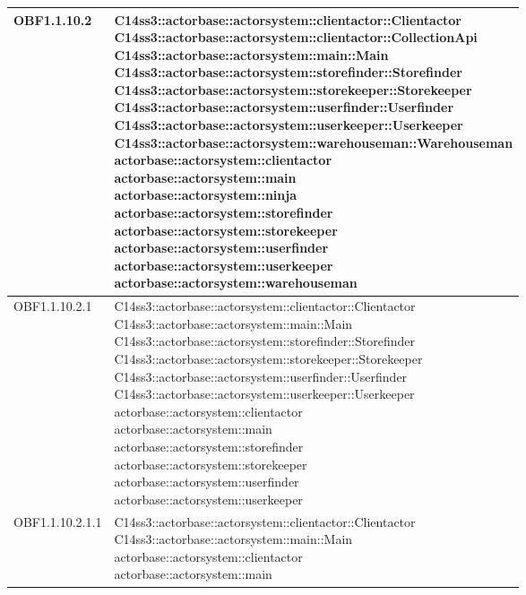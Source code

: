 \documentclass{scalatekids-article}
\begin{document}
\begin{longtable}[H]{|p{4.5cm}|p{13cm}|}
OBF1.1.10.2 & \multiLineCell[t]{C14ss3::actorbase::actorsystem::clientactor::Clientactor\\C14ss3::actorbase::actorsystem::clientactor::CollectionApi\\C14ss3::actorbase::actorsystem::main::Main\\C14ss3::actorbase::actorsystem::storefinder::Storefinder\\C14ss3::actorbase::actorsystem::storekeeper::Storekeeper\\C14ss3::actorbase::actorsystem::userfinder::Userfinder\\C14ss3::actorbase::actorsystem::userkeeper::Userkeeper\\C14ss3::actorbase::actorsystem::warehouseman::Warehouseman\\actorbase::actorsystem::clientactor\\actorbase::actorsystem::main\\actorbase::actorsystem::ninja\\actorbase::actorsystem::storefinder\\actorbase::actorsystem::storekeeper\\actorbase::actorsystem::userfinder\\actorbase::actorsystem::userkeeper\\actorbase::actorsystem::warehouseman\\}\\
\hline
OBF1.1.10.2.1 & \multiLineCell[t]{C14ss3::actorbase::actorsystem::clientactor::Clientactor\\C14ss3::actorbase::actorsystem::main::Main\\C14ss3::actorbase::actorsystem::storefinder::Storefinder\\C14ss3::actorbase::actorsystem::storekeeper::Storekeeper\\C14ss3::actorbase::actorsystem::userfinder::Userfinder\\C14ss3::actorbase::actorsystem::userkeeper::Userkeeper\\actorbase::actorsystem::clientactor\\actorbase::actorsystem::main\\actorbase::actorsystem::storefinder\\actorbase::actorsystem::storekeeper\\actorbase::actorsystem::userfinder\\actorbase::actorsystem::userkeeper\\}\\
\hline
OBF1.1.10.2.1.1 & \multiLineCell[t]{C14ss3::actorbase::actorsystem::clientactor::Clientactor\\C14ss3::actorbase::actorsystem::main::Main\\actorbase::actorsystem::clientactor\\actorbase::actorsystem::main\\}\\

\end{longtable}
\end{document}
